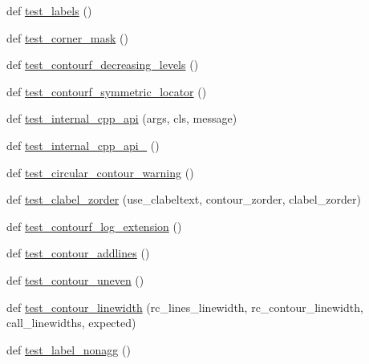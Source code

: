\begin{DoxyCompactItemize}
\item 
def \hyperlink{namespacematplotlib_1_1tests_1_1test__contour_ac087213a917fc8e574a87871bf4faa80}{test\+\_\+labels} ()
\item 
def \hyperlink{namespacematplotlib_1_1tests_1_1test__contour_afdd8a34fbb84af01d1b73cd6c8c10569}{test\+\_\+corner\+\_\+mask} ()
\item 
def \hyperlink{namespacematplotlib_1_1tests_1_1test__contour_af166a261423649518ac5e8fac213fd9a}{test\+\_\+contourf\+\_\+decreasing\+\_\+levels} ()
\item 
def \hyperlink{namespacematplotlib_1_1tests_1_1test__contour_a83f8ca67bcac463cb9d34a67317b3c22}{test\+\_\+contourf\+\_\+symmetric\+\_\+locator} ()
\item 
def \hyperlink{namespacematplotlib_1_1tests_1_1test__contour_a04d3e9770f037d1b4d5b82ae8d9495f8}{test\+\_\+internal\+\_\+cpp\+\_\+api} (args, cls, message)
\item 
def \hyperlink{namespacematplotlib_1_1tests_1_1test__contour_aa2a46046abc89b5815e02e0ea19fa891}{test\+\_\+internal\+\_\+cpp\+\_\+api\+\_} ()
\item 
def \hyperlink{namespacematplotlib_1_1tests_1_1test__contour_ad00cb25a982dd27fa825201d2a886289}{test\+\_\+circular\+\_\+contour\+\_\+warning} ()
\item 
def \hyperlink{namespacematplotlib_1_1tests_1_1test__contour_a82830ad66e9e7dd905f7d8174c807d97}{test\+\_\+clabel\+\_\+zorder} (use\+\_\+clabeltext, contour\+\_\+zorder, clabel\+\_\+zorder)
\item 
def \hyperlink{namespacematplotlib_1_1tests_1_1test__contour_a7ac46fdd6f68646f3c809ff061a17917}{test\+\_\+contourf\+\_\+log\+\_\+extension} ()
\item 
def \hyperlink{namespacematplotlib_1_1tests_1_1test__contour_a9b6dd6b8f04844a17ed70acaa76cb761}{test\+\_\+contour\+\_\+addlines} ()
\item 
def \hyperlink{namespacematplotlib_1_1tests_1_1test__contour_a13531c69dea6dcfc7eb22e17aa684199}{test\+\_\+contour\+\_\+uneven} ()
\item 
def \hyperlink{namespacematplotlib_1_1tests_1_1test__contour_a00d8f505a5e94eb31188377602334e47}{test\+\_\+contour\+\_\+linewidth} (rc\+\_\+lines\+\_\+linewidth, rc\+\_\+contour\+\_\+linewidth, call\+\_\+linewidths, expected)
\item 
def \hyperlink{namespacematplotlib_1_1tests_1_1test__contour_a74243a239c915dfe39273390863eff21}{test\+\_\+label\+\_\+nonagg} ()
\end{DoxyCompactItemize}


